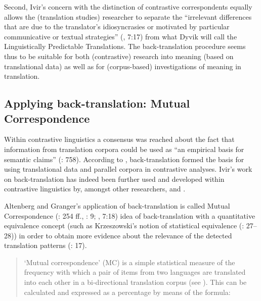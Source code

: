 Second, Ivir’s concern with the distinction of contrastive correspondents equally allows the (translation studies) researcher to separate the “irrelevant differences that are due to the translator’s idiosyncrasies or motivated by particular communicative or textual strategies”  (\citealt{AltenbergGranger2002a}, 7:17) from what Dyvik will call the Linguistically Predictable Translations. The back-translation procedure seems thus to be suitable for both (contrastive) research into meaning (based on translational data) as well as for (corpus-based) investigations of meaning in translation.


\subsection{\label{sec:2.3.3}  Applying back-translation: Mutual Correspondence}

Within contrastive linguistics a consensus was reached about the fact that information from translation corpora could be used as “an empirical basis for semantic claims” (\citealt{noel_translations_2003}: 758). According to \citet[24-28]{ebeling_patterns_2013}, back-translation formed the basis for using translational data and parallel corpora in contrastive analyses. Ivir’s work on back-translation has indeed been further used and developed within contrastive linguistics by, amongst other researchers, \citet{hasselgard_adverbial_1999} and \citet{AltenbergGranger2002a}.



Altenberg and Granger’s application of back-translation is called Mutual Correspondence (\citealt{hasselgard_adverbial_1999}: 254 ff., \citealt{altenberg_correspondence_2007}: 9; \citealt{AltenbergGranger2002}, 7:18)   idea of back-translation with a quantitative equivalence concept (such as Krzeszowski’s notion of statistical equivalence (\citealt{krzeszowski_contrasting_1990}: 27–28)) in order to obtain more evidence about the relevance of the detected translation patterns (\citealt{AltenbergGranger2002}: 17).





\begin{quote}
‘Mutual correspondence’ (MC) is a simple statistical measure of the frequency with which a pair of items from two languages are translated into each other in a bi-directional translation corpus (see \citealt{hasselgard_adverbial_1999}). This can be calculated and expressed as a percentage by means of the formula:
\end{quote}

